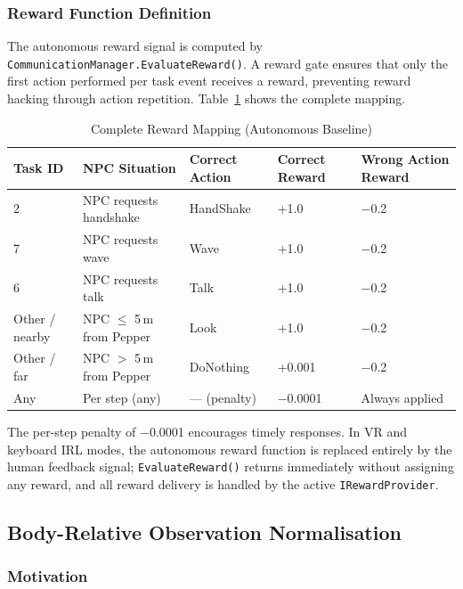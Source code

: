 \documentclass[../report.tex]{subfiles}
\begin{document}
    \subsubsection{Reward Function Definition}

    The autonomous reward signal is computed by \texttt{CommunicationManager.EvaluateReward()}. A reward gate ensures that only the first action performed per task event receives a reward, preventing reward hacking through action repetition. Table~\ref{tab:reward} shows the complete mapping.

    \begin{table}[t]
        \centering
        \caption{Complete Reward Mapping (Autonomous Baseline)}
        \label{tab:reward}
        \begin{tabular}{lllll}
            \toprule
            \textbf{Task ID} & \textbf{NPC Situation} & \textbf{Correct Action} & \textbf{Correct Reward} & \textbf{Wrong Action Reward} \\
            \midrule
            2 & NPC requests handshake & HandShake & +1.0 & $-$0.2 \\
            7 & NPC requests wave & Wave & +1.0 & $-$0.2 \\
            6 & NPC requests talk & Talk & +1.0 & $-$0.2 \\
            Other / nearby & NPC $\leq$ 5\,m from Pepper & Look & +1.0 & $-$0.2 \\
            Other / far & NPC $>$ 5\,m from Pepper & DoNothing & +0.001 & $-$0.2 \\
            Any & Per step (any) & --- (penalty) & $-$0.0001 & Always applied \\
            \bottomrule
        \end{tabular}
    \end{table}

    The per-step penalty of $-$0.0001 encourages timely responses. In VR and keyboard IRL modes, the autonomous reward function is replaced entirely by the human feedback signal; \texttt{EvaluateReward()} returns immediately without assigning any reward, and all reward delivery is handled by the active \texttt{IRewardProvider}.

    \subsection{Body-Relative Observation Normalisation}
    \label{sec:methodology:normalisation}

    \subsubsection{Motivation}
\end{document}
